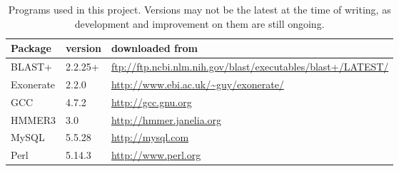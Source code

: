 \begin{table}
	\caption[Programs used in this project]{Programs used in this project.
	Versions may not be the latest at the time of writing, as development and
	improvement on them are still ongoing.}
	\begin{tabularx}{\textwidth}{p{} p{} p{}}
	\hline
	Package   & version & downloaded from \\
	\hline
	BLAST+    & 2.2.25+ & \url{ftp://ftp.ncbi.nlm.nih.gov/blast/executables/blast+/LATEST/} \\
	Exonerate & 2.2.0   & \url{http://www.ebi.ac.uk/~guy/exonerate/} \\
	GCC       & 4.7.2   & \url{http://gcc.gnu.org} \\
	HMMER3    & 3.0     & \url{http://hmmer.janelia.org} \\
	MySQL     & 5.5.28  & \url{http://mysql.com} \\
	Perl      & 5.14.3  & \url{http://www.perl.org} \\
	\end{tabularx}
	\label{tab:programs}
\end{table}

